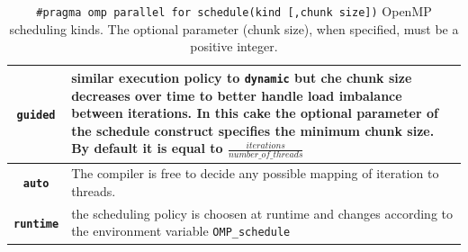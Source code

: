 \begin{description}
\begin{table}
\begin{tabularx}{1.0\textwidth}{cX}
    		\rowcolor{gray!15}
    		\texttt{\textbf{guided}} & similar execution policy  to \texttt{dynamic} but che chunk size decreases over time to better handle load imbalance between iterations. In this cake the optional parameter of the schedule construct specifies the minimum chunk size. By default it is equal to $\frac{iterations}{number\_of\_threads}$\\ \hline
    		
    		\rowcolor{gray!5}
    		\texttt{\textbf{auto}} & The compiler is free to decide any possible mapping of iteration to threads.\\ \hline
    		
    		\rowcolor{gray!15}
    		\texttt{\textbf{runtime}} & the scheduling policy is choosen at runtime and changes according to the environment variable \verb|OMP_schedule| \\ \hline
    	\end{tabularx}
    
    	\caption[OpenMP scheduling policies]{\texttt{\#pragma omp parallel for schedule(kind [,chunk size])} OpenMP scheduling kinds. The optional parameter (chunk size), when specified, must be a positive integer. }
    	\label{tab:scheduling_policies}
    \end{table}
    

\end{description}
